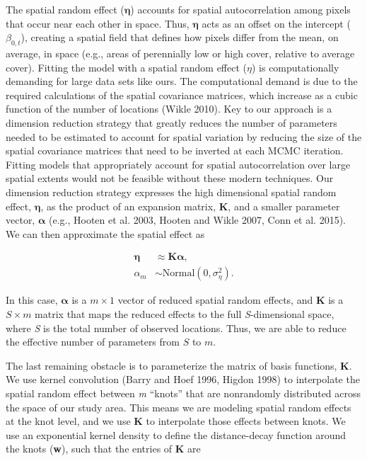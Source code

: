 \documentclass[12pt,]{article}
\begin{document}
The spatial random effect (\(\boldsymbol{\eta}\)) accounts for spatial
autocorrelation among pixels that occur near each other in space. Thus,
\(\boldsymbol{\eta}\) acts as an offset on the intercept
(\(\beta_{0,t}\)), creating a spatial field that defines how pixels
differ from the mean, on average, in space (e.g., areas of perennially
low or high cover, relative to average cover). Fitting the model with a
spatial random effect (\(\eta\)) is computationally demanding for large
data sets like ours. The computational demand is due to the required
calculations of the spatial covariance matrices, which increase as a
cubic function of the number of locations (Wikle 2010). Key to our
approach is a dimension reduction strategy that greatly reduces the
number of parameters needed to be estimated to account for spatial
variation by reducing the size of the spatial covariance matrices that
need to be inverted at each MCMC iteration. Fitting models that
appropriately account for spatial autocorrelation over large spatial
extents would not be feasible without these modern techniques. Our
dimension reduction strategy expresses the high dimensional spatial
random effect, \(\boldsymbol{\eta}\), as the product of an expansion
matrix, \textbf{K}, and a smaller parameter vector,
\(\boldsymbol{\alpha}\) (e.g., Hooten et al. 2003, Hooten and Wikle
2007, Conn et al. 2015). We can then approximate the spatial effect as

\vspace{-4em}\begin{align}
\boldsymbol{\eta} &\approx \textbf{K}\boldsymbol{\alpha}, \\
\alpha_{m} &\sim \text{Normal}(0,\sigma_{\eta}^2).
\end{align}\vspace{-4em}

In this case, \(\boldsymbol{\alpha}\) is a \(m \times 1\) vector of
reduced spatial random effects, and \textbf{K} is a \(S \times m\)
matrix that maps the reduced effects to the full \emph{S}-dimensional
space, where \emph{S} is the total number of observed locations. Thus,
we are able to reduce the effective number of parameters from \({S}\) to
\(m\).

The last remaining obstacle is to parameterize the matrix of basis
functions, \textbf{K}. We use kernel convolution (Barry and Hoef 1996,
Higdon 1998) to interpolate the spatial random effect between \emph{m}
``knots'' that are nonrandomly distributed across the space of our study
area. This means we are modeling spatial random effects at the knot
level, and we use \textbf{K} to interpolate those effects between knots.
We use an exponential kernel density to define the distance-decay
function around the knots (\textbf{w}), such that the entries of
\textbf{K} are
\end{document}
